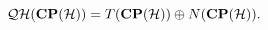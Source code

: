 \begin{equation}
{\cal QH}({\bf CP}({\cal H}))=T({\bf CP}({\cal H}))\oplus N({\bf CP}({\cal H})).
\label{compelto}
\end{equation}

